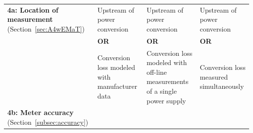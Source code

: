 \begin{table}
\begin{tabular}{|p{3cm}|p{3.5cm}|p{3.5cm}|p{3.5cm}|}
\textbf{4a: Location of measurement} (Section~\ref{sec:A4wEMaT})&
Upstream of power conversion &
Upstream of power conversion &
Upstream of power conversion\\

 &
\centering \textbf{OR} &
\centering \textbf{OR} &
\centering \textbf{OR} \tabularnewline

 &
Conversion loss modeled with manufacturer data &
Conversion loss modeled with off-line measurements of a single power supply &
Conversion loss measured simultaneously \\
\hline
\textbf{4b: Meter accuracy } (Section~\ref{subsec:accuracy})&
\SpecAccuracyLOne{} &
\SpecAccuracyLTwo{} &
\SpecAccuracyLThree{} \\
\hline
\end{tabular}
\end{table}